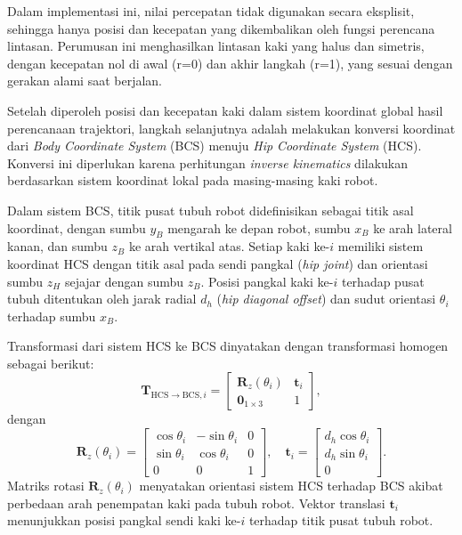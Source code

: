 Dalam implementasi ini, nilai percepatan tidak digunakan secara eksplisit,
sehingga hanya posisi dan kecepatan yang dikembalikan oleh fungsi perencana
lintasan. Perumusan ini menghasilkan lintasan kaki yang halus dan simetris,
dengan kecepatan nol di awal (r=0) dan akhir langkah (r=1), yang sesuai
dengan gerakan alami saat berjalan.

Setelah diperoleh posisi dan kecepatan kaki dalam sistem koordinat global hasil
perencanaan trajektori, langkah selanjutnya adalah melakukan konversi koordinat
dari \textit{Body Coordinate System} (BCS) menuju \textit{Hip Coordinate System}
(HCS). Konversi ini diperlukan karena perhitungan \textit{inverse kinematics}
dilakukan berdasarkan sistem koordinat lokal pada masing-masing kaki robot.

Dalam sistem BCS, titik pusat tubuh robot didefinisikan sebagai titik asal
koordinat, dengan sumbu \(y_B\) mengarah ke depan robot, sumbu \(x_B\) ke arah
lateral kanan, dan sumbu \(z_B\) ke arah vertikal atas. Setiap kaki ke-\(i\)
memiliki sistem koordinat HCS dengan titik asal pada sendi pangkal (\textit{hip
joint}) dan orientasi sumbu \(z_H\) sejajar dengan sumbu \(z_B\). Posisi pangkal
kaki ke-\(i\) terhadap pusat tubuh ditentukan oleh jarak radial \(d_h\)
(\textit{hip diagonal offset}) dan sudut orientasi \(\theta_i\) terhadap sumbu
\(x_B\).

Transformasi dari sistem HCS ke BCS dinyatakan dengan transformasi homogen sebagai berikut:
\begin{equation}
\mathbf{T}_{\text{HCS}\rightarrow\text{BCS}, i} =
\begin{bmatrix}
\mathbf{R}_{z}(\theta_i) & \mathbf{t}_i \\
\mathbf{0}_{1\times3} & 1
\end{bmatrix},
\label{eq:T_HCS_BCS}
\end{equation}
dengan
\begin{equation}
\mathbf{R}_{z}(\theta_i) =
\begin{bmatrix}
\cos\theta_i & -\sin\theta_i & 0 \\
\sin\theta_i & \cos\theta_i & 0 \\
0 & 0 & 1
\end{bmatrix},
\quad
\mathbf{t}_i =
\begin{bmatrix}
d_h \cos\theta_i \\[4pt]
d_h \sin\theta_i \\[4pt]
0
\end{bmatrix}.
\end{equation}
Matriks rotasi \(\mathbf{R}_{z}(\theta_i)\) menyatakan orientasi sistem HCS
terhadap BCS akibat perbedaan arah penempatan kaki pada tubuh robot. Vektor
translasi \(\mathbf{t}_i\) menunjukkan posisi pangkal sendi kaki ke-\(i\)
terhadap titik pusat tubuh robot.

